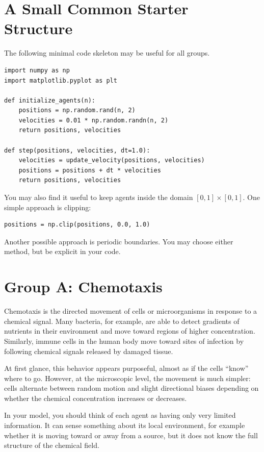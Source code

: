 \documentclass[paper=letter, fontsize=12pt]{article}
\numberwithin{equation}{section}
\begin{document}
\section*{A Small Common Starter Structure}

The following minimal code skeleton may be useful for all groups.

\begin{lstlisting}
import numpy as np
import matplotlib.pyplot as plt

def initialize_agents(n):
    positions = np.random.rand(n, 2)
    velocities = 0.01 * np.random.randn(n, 2)
    return positions, velocities

def step(positions, velocities, dt=1.0):
    velocities = update_velocity(positions, velocities)
    positions = positions + dt * velocities
    return positions, velocities
\end{lstlisting}

You may also find it useful to keep agents inside the domain \([0,1]\times[0,1]\). One simple approach is clipping:

\begin{lstlisting}
positions = np.clip(positions, 0.0, 1.0)
\end{lstlisting}

Another possible approach is periodic boundaries. You may choose either method, but be explicit in your code.

\section*{Group A: Chemotaxis}

Chemotaxis is the directed movement of cells or microorganisms in response to a chemical signal. Many bacteria, for example, are able to detect gradients of nutrients in their environment and move toward regions of higher concentration. Similarly, immune cells in the human body move toward sites of infection by following chemical signals released by damaged tissue.

At first glance, this behavior appears purposeful, almost as if the cells ``know'' where to go. However, at the microscopic level, the movement is much simpler: cells alternate between random motion and slight directional biases depending on whether the chemical concentration increases or decreases.

In your model, you should think of each agent as having only very limited information. It can sense something about its local environment, for example whether it is moving toward or away from a source, but it does not know the full structure of the chemical field.
\end{document}
